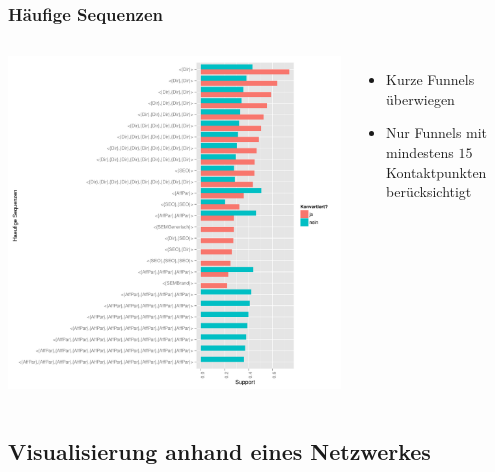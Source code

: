 \begin{frame}\frametitle{Häufige Sequenzen}
	\begin{columns}
		\column{7cm}
			\includegraphics[scale=0.27]{spm_min15.pdf}
		\column{4cm}
			\begin{itemize}
				\item Kurze Funnels überwiegen
				\item Nur Funnels mit mindestens $15$ Kontaktpunkten berücksichtigt
			\end{itemize}
	\end{columns}
\end{frame}

\subsection{Visualisierung anhand eines Netzwerkes}

